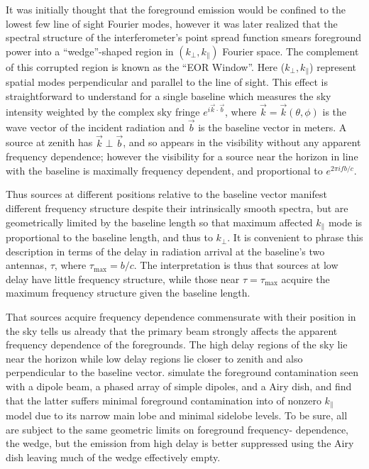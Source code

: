 \documentclass{emulateapj}
\begin{document}
It was initially thought that the foreground emission would be confined to the lowest few 
line of sight Fourier modes, however it was later realized that the spectral structure of the 
interferometer's point spread function smears foreground power into a ``wedge''-shaped 
region in  $(k_\perp,k_\parallel)$ Fourier space. The complement of this corrupted region 
is known as the ``EOR Window''. Here ($k_\perp,k_\parallel$) represent spatial modes 
perpendicular and parallel to the line of sight. This effect is straightforward to understand 
for a single baseline which measures the sky intensity weighted by the complex sky fringe 
$e^{i \vec{k}\cdot\vec{b}}$, where $\vec{k}=\vec{k}(\theta,\phi)$ is the wave vector of 
the incident radiation and $\vec{b}$ is the baseline vector in meters. A source at zenith 
has $\vec{k}\perp\vec{b}$, and so appears in the visibility without any apparent 
frequency dependence; however the visibility for a source near the horizon in line with the 
baseline is maximally frequency dependent, and proportional to $e^{2\pi i f b/c}$. 

Thus sources at different positions relative to the baseline vector manifest different 
frequency structure despite their intrinsically smooth spectra, but are geometrically limited 
by the baseline length so that maximum affected $k_\parallel$ mode is proportional to the 
baseline length, and thus to $k_\perp$. It is convenient to phrase this description in terms 
of the delay in radiation arrival at the baseline's two antennas, $\tau$, where $\tau_
\text{max}=b/c$. The interpretation is thus that sources at low delay have little frequency 
structure, while those near $\tau=\tau_\text{max}$ acquire the maximum frequency 
structure given the baseline length. 

That sources acquire frequency dependence commensurate with their position in the sky 
tells us already that the primary beam strongly affects the apparent frequency dependence 
of the foregrounds. The high delay regions of the sky lie near the horizon while low delay 
regions lie closer to zenith and also perpendicular to the baseline vector. \citet{nithya15} 
simulate the foreground contamination seen with a dipole beam, a phased array of simple 
dipoles, and a Airy dish, and find that the latter suffers minimal foreground contamination 
into of nonzero $k_\parallel$ model due to its narrow main lobe and minimal sidelobe 
levels. To be sure, all are subject to the same geometric limits on foreground frequency-
dependence, the wedge, but the emission from high delay is better suppressed using the 
Airy dish leaving much of the wedge effectively empty. 
\end{document}
